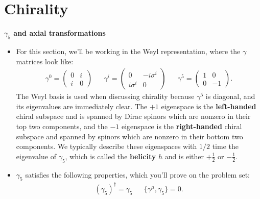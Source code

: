 \documentclass[12pt, oneside]{article}   	%
\theoremstyle{definition}
\begin{document}

%


\section*{Chirality}

\textbf{$\gamma_5$ and axial transformations}

\begin{itemize}

	\item For this section, we'll be working in the Weyl representation, where the $\gamma$ matrices look like:
	\begin{align}
		\gamma^0 = \begin{pmatrix} 0 & i \\ i & 0 \end{pmatrix} && \gamma^i = \begin{pmatrix} 0 & -i\sigma^i \\ i\sigma^i & 0 \end{pmatrix} && \gamma^5 = \begin{pmatrix} 1 & 0 \\ 0 & -1 \end{pmatrix}.
	\end{align}
	The Weyl basis is used when discussing chirality because $\gamma^5$ is diagonal, and its eigenvalues are immediately clear. The $+1$ eigenspace is the \textbf{left-handed} chiral subspace and is spanned by Dirac spinors which are nonzero in their top two components, and the $-1$ eigenspace is the \textbf{right-handed} chiral subspace and spanned by spinors which are nonzero in their bottom two components. We typically describe these eigenspaces with $1/2$ time the eigenvalue of $\gamma_5$, which is called the \textbf{helicity} $h$ and is either $+\frac{1}{2}$ or $-\frac{1}{2}$. 

	\item $\gamma_5$ satisfies the following properties, which you'll prove on the problem set:
	\begin{align}
		(\gamma_5)^\dagger = \gamma_5 && \{\gamma^\mu, \gamma_5\} = 0. \label{eq:gamma5_properties}
	\end{align}


\end{itemize}
\end{document}
